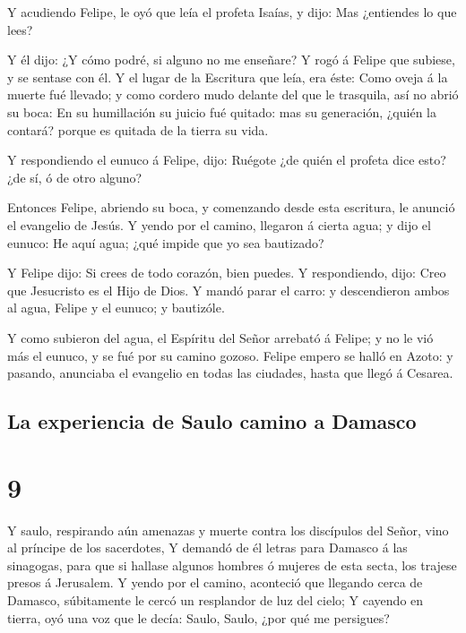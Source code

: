  Y acudiendo Felipe, le oyó que leía el profeta Isaías, y
dijo: Mas ¿entiendes lo que lees?

 Y él dijo: ¿Y cómo podré, si alguno no me enseñare? Y rogó
á Felipe que subiese, y se sentase con él.  Y el lugar de
la Escritura que leía, era éste: Como oveja á la muerte fué llevado; y
como cordero mudo delante del que le trasquila, así no abrió su boca:
 En su humillación su juicio fué quitado: mas su
generación, ¿quién la contará? porque es quitada de la tierra su vida.

 Y respondiendo el eunuco á Felipe, dijo: Ruégote ¿de quién
el profeta dice esto? ¿de sí, ó de otro alguno?

 Entonces Felipe, abriendo su boca, y comenzando desde esta
escritura, le anunció el evangelio de Jesús.  Y yendo por
el camino, llegaron á cierta agua; y dijo el eunuco: He aquí agua; ¿qué
impide que yo sea bautizado?

 Y Felipe dijo: Si crees de todo corazón, bien puedes. Y
respondiendo, dijo: Creo que Jesucristo es el Hijo de Dios.
 Y mandó parar el carro: y descendieron ambos al agua,
Felipe y el eunuco; y bautizóle.

 Y como subieron del agua, el Espíritu del Señor arrebató á
Felipe; y no le vió más el eunuco, y se fué por su camino gozoso.
 Felipe empero se halló en Azoto: y pasando, anunciaba el
evangelio en todas las ciudades, hasta que llegó á Cesarea.

\hypertarget{la-experiencia-de-saulo-camino-a-damasco}{%
\subsection{La experiencia de Saulo camino a
Damasco}\label{la-experiencia-de-saulo-camino-a-damasco}}

\hypertarget{section-8}{%
\section{9}\label{section-8}}

 Y saulo, respirando aún amenazas y muerte contra los
discípulos del Señor, vino al príncipe de los sacerdotes,  Y
demandó de él letras para Damasco á las sinagogas, para que si hallase
algunos hombres ó mujeres de esta secta, los trajese presos á Jerusalem.
 Y yendo por el camino, aconteció que llegando cerca de
Damasco, súbitamente le cercó un resplandor de luz del cielo;
 Y cayendo en tierra, oyó una voz que le decía: Saulo,
Saulo, ¿por qué me persigues?

